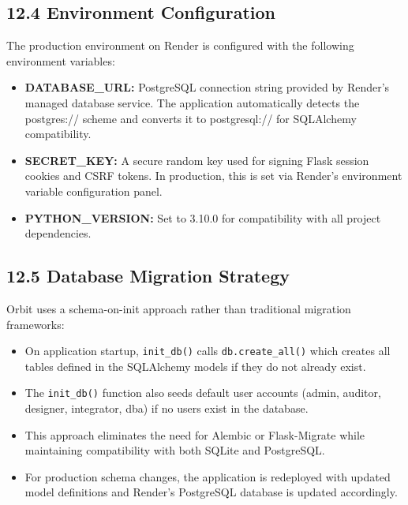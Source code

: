 ﻿\documentclass[12pt]{article}
\begin{document}
\subsection*{12.4 Environment Configuration}
The production environment on Render is configured with the following environment variables:
\begin{itemize}
\item \textbf{DATABASE\_URL:} PostgreSQL connection string provided by Render's managed database service. The application automatically detects the postgres:// scheme and converts it to postgresql:// for SQLAlchemy compatibility.
\item \textbf{SECRET\_KEY:} A secure random key used for signing Flask session cookies and CSRF tokens. In production, this is set via Render's environment variable configuration panel.
\item \textbf{PYTHON\_VERSION:} Set to 3.10.0 for compatibility with all project dependencies.
\end{itemize}

\subsection*{12.5 Database Migration Strategy}
Orbit uses a schema-on-init approach rather than traditional migration frameworks:
\begin{itemize}
\item On application startup, \texttt{init\_db()} calls \texttt{db.create\_all()} which creates all tables defined in the SQLAlchemy models if they do not already exist.
\item The \texttt{init\_db()} function also seeds default user accounts (admin, auditor, designer, integrator, dba) if no users exist in the database.
\item This approach eliminates the need for Alembic or Flask-Migrate while maintaining compatibility with both SQLite and PostgreSQL.
\item For production schema changes, the application is redeployed with updated model definitions and Render's PostgreSQL database is updated accordingly.
\end{itemize}
\end{document}
